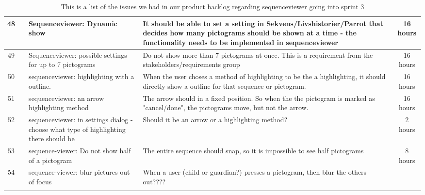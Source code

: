 \begin{longtable} { | c | c | p{5cm} | p{5cm} | c | } 
	48	&		 &	Sequenceviewer: Dynamic show	 &		It should be able to set a setting in Sekvens/Livshistorier/Parrot that decides how many pictograms should be shown at a time - the functionality needs to be implemented in sequenceviewer	 &	16 hours \\\hline
	49	&		 &	Sequenceviewer: possible settings for up to 7 pictograms		 &		Do not show more than 7 pictograms at once. This is a requirement from the stakeholders/requirements group			 & 	16 hours	\\\hline
	50	&		 &	sequenceviewer: highlighting with a outline.	 &	When the user choses a method of highlighting to be the a highlighting, it should directly show a outline for that sequence or pictogram.			 &	16 hours \\\hline
	51	&		 &	sequenceviewer: an arrow highlighting method	 &	The arrow should in a fixed position. So when the the pictogram is marked as "cancel/done", the pictograms move, but not the arrow.				 &	16 hours \\\hline
	52	&		 &	sequenceviewer: in settings dialog - choose what type of highlighting there should be		 &	Should it be an arrow or a highlighting method?	 &	2 hours \\\hline
	53	&		 &	sequence-viewer: Do not show half of a pictogram		 & 	The entire sequence should snap, so it is impossible to see half pictograms	 &	8 hours	\\\hline
	54	&		 &	sequence-viewer: blur pictures out of focus		 &	When a user (child or guardian?) presses a pictogram, then blur the others out????			 &	\\\hline
\caption{This is a list of the issues we had in our product backlog regarding sequenceviewer going into sprint 3}
\label{tab:spr3_sw_prodblog}
\end{longtable}

